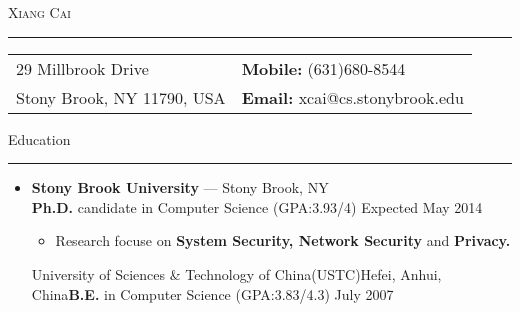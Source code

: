 \documentclass[11pt,oneside]{article}
\makeatletter
\newcommand{\name}{Xiang Cai\xspace}
\newcommand{\addrlinea}{29 Millbrook Drive\xspace}
\newcommand{\addrlineb}{Stony Brook, NY 11790, USA\xspace}
\newcommand{\phone}{\hfill \textbf{Mobile: }(631)680-8544\xspace}
\newcommand{\email}{\hfill \textbf{Email: }xcai@cs.stonybrook.edu\xspace}
\newcommand{\bigname}[1]{
	\begin{center}\fontfamily{phv}\selectfont\Huge\scshape#1\end{center}
}
\newcommand{\contact}[1]{
	\begin{flushleft}\fontfamily{phv}\selectfont\Huge\Large#1\end{flushleft}
}
\newenvironment{ressection}[1]{
	\vspace{-1pt}
	{\fontfamily{phv}\selectfont\Large#1}
	
	\vspace{-8pt} \rule{\textwidth}{.5pt}
	
	\vspace{-8pt}
	\begin{itemize}
	\vspace{.5pt}
}{
	\end{itemize}
}
\newcommand{\resitem}[1]{
	\vspace{1pt}
	\item \begin{flushleft} #1 \end{flushleft}
}
\newcommand{\ressubitem}[1]{
	\vspace{-4pt}
	\item \begin{flushleft} #1 \end{flushleft}
}
\newcommand{\resbigitem}[3]{
	\vspace{-5pt}
	\item
	\textbf{#1} --- #2 \\
	{#3}
}
\newenvironment{ressubsec}[3]{
	\resbigitem{#1}{#2}{#3}
	\vspace{-4pt}
	\begin{itemize}
}{
	\end{itemize}
}
\newenvironment{ressubsec_empty}[3]{
	\resbigitem{#1}{#2}{#3}
	\vspace{-2pt}
}
\makeatother
\begin{document}
\bigname{\name}

\vspace{-8pt} \rule{\textwidth}{1pt}



\vspace{-6pt}
\begin{table}[h]
\begin{tabular}[h]{p{}p{}}
\addrlinea & \phone \\
\addrlineb & \email \\
\end{tabular}
\end{table}

\vspace{-4pt}




\begin{ressection}{Education}

	\begin{ressubsec}{Stony Brook University}{Stony Brook, NY}{\textbf{Ph.D.} candidate
		in Computer Science (GPA:3.93/4) \hfill Expected May 2014}
		\ressubitem{Research focuse on \textbf{System Security, Network Security} and \textbf{Privacy.}
		}
		
	\end{ressubsec}

	\vspace{-4pt}
	\begin{ressubsec_empty}{University of Sciences \& Technology of
		China(USTC)}{Hefei, Anhui, China}{\textbf{B.E.} in Computer
			Science (GPA:3.83/4.3) \hfill July 2007}
	\end{ressubsec_empty}


\end{ressection}
\end{document}
